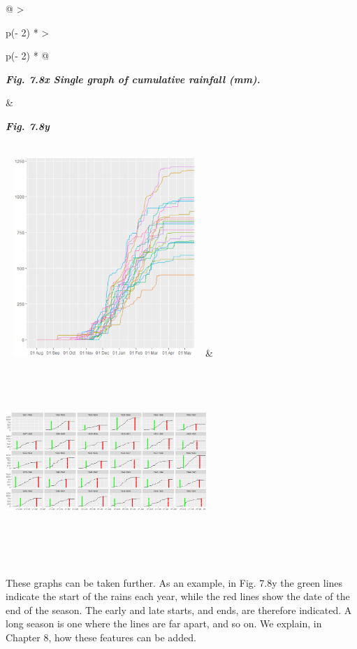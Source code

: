 \documentclass[
  letterpaper,
  DIV=11,
  numbers=noendperiod]{scrreprt}
\begin{document}
\begin{longtable}[]{@{}
  >{\raggedright\arraybackslash}p{(\columnwidth - 2\tabcolsep) * }
  >{\raggedright\arraybackslash}p{(\columnwidth - 2\tabcolsep) * }@{}}
\toprule\noalign{}
\begin{minipage}[b]{\linewidth}\raggedright
\textbf{\emph{Fig. 7.8x Single graph of cumulative rainfall (mm).}}
\end{minipage} & \begin{minipage}[b]{\linewidth}\raggedright
\textbf{\emph{Fig. 7.8y}}
\end{minipage} \\
\midrule\noalign{}
\endhead
\bottomrule\noalign{}
\endlastfoot
\includegraphics[width=2.93154in,height=2.97971in]{figures/Fig7.8x.png}
&
\includegraphics[width=2.99269in,height=3.02322in]{figures/Fig7.8y.png} \\
\end{longtable}

These graphs can be taken further. As an example, in Fig. 7.8y the green
lines indicate the start of the rains each year, while the red lines
show the date of the end of the season. The early and late starts, and
ends, are therefore indicated. A long season is one where the lines are
far apart, and so on. We explain, in Chapter 8, how these features can
be added.
\end{document}
